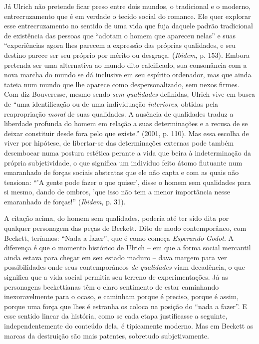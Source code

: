 Já Ulrich não pretende ficar preso entre dois mundos, o tradicional e o
moderno, entrecruzamento que é em verdade o tecido social do romance.
Ele quer explorar esse entrecruzamento no sentido de uma vida que fuja
daquele padrão tradicional de existência das pessoas que ``adotam o
homem que apareceu nelas'' e suas ``experiências agora lhes parecem a
expressão das próprias qualidades, e seu destino parece ser seu próprio
por mérito ou desgraça. (\emph{Ibidem}, p. 153). Embora pretenda ser uma
alternativa ao mundo dito calcificado, sua consonância com a nova marcha
do mundo se dá inclusive em seu espírito ordenador, mas que ainda tateia
num mundo que lhe aparece como despersonalizado, sem nexos firmes. Com
diz Bouveresse, mesmo sendo \emph{sem} \emph{qualidades} definidas,
Ulrich vive em busca de ``uma identificação ou de uma individuação
\emph{interiores}, obtidas pela reapropriação \emph{moral} de suas
qualidades. A ausência de qualidades traduz a liberdade profunda do
homem em relação a suas determinações e a recusa de se deixar constituir
desde fora pelo que existe.'' (2001, p. 110). Mas essa escolha de viver
por hipótese, de libertar-se das determinações externas pode também
desembocar numa postura estética perante a vida que beira à
indeterminação da própria subjetividade, o que significa um indivíduo
feito átomo flutuante num emaranhado de forças sociais abstratas que ele
não capta e com as quais não tensiona: ``'A gente pode fazer o que
quiser', disse o homem sem qualidades para si mesmo, dando de ombros,
'que isso não tem a menor importância nesse emaranhado de forças!''
(\emph{Ibidem}, p. 31).

A citação acima, do homem sem qualidades, poderia até ter sido dita por
qualquer personagem das peças de Beckett. Dito de modo contemporâneo,
com Beckett, teríamos: ``Nada a fazer'', que é como começa
\emph{Esperando} \emph{Godot}. A diferença é que o momento histórico de
Ulrich -- em que a forma social mercantil ainda estava para chegar em
seu estado maduro -- dava margem para ver possibilidades onde seus
contemporâneos \emph{de qualidades} viam decadência, o que significa que
a vida social permitia seu terreno de experimentações. Já as personagens
beckettianas têm o claro sentimento de estar caminhando inexoravelmente
para o ocaso, e caminham porque é preciso, porque é assim, porque uma
força que lhes é estranha os coloca na posição do ``nada a fazer''. E
esse sentido linear da história, como se cada etapa justificasse a
seguinte, independentemente do conteúdo dela, é tipicamente moderno. Mas
em Beckett as marcas da destruição são mais patentes, sobretudo
subjetivamente.

